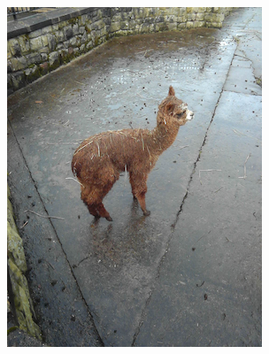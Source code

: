 \documentclass{l4proj}
\begin{document}
\begin{figure}[ht]
\begin{subfigure}[h!]{0.18\textwidth}
    \includegraphics[width=\textwidth, trim={0cm 1.6cm 0cm 1.6cm}, clip]{images/dataset/alpaca/rgb.png}

\end{subfigure}
\end{figure}
\end{document}
